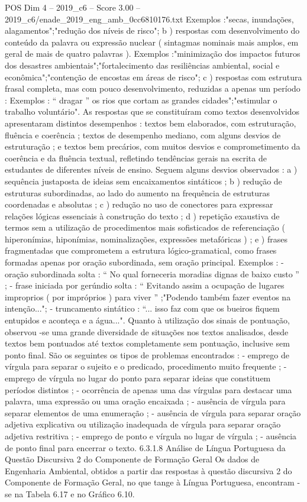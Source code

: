 \begin{textsample}{POS Dim 4 – 2019\_c6 – Score 3.00 – 2019\_c6/enade\_2019\_eng\_amb\_0cc6810176.txt}
Exemplos :"secas, inundações, alagamentos";"redução dos níveis de risco"; b ) respostas com desenvolvimento do conteúdo da palavra ou expressão nuclear ( sintagmas nominais mais amplos, em geral de mais de quatro palavras ).
Exemplos :"minimização dos impactos futuros dos desastres ambientais";"fortalecimento das resiliências ambiental, social e econômica";"contenção de encostas em áreas de risco"; c ) respostas com estrutura frasal completa, mas com pouco desenvolvimento, reduzidas a apenas um período : Exemplos : “ dragar ” os rios que cortam as grandes cidades";"estimular o trabalho voluntário".
As respostas que se constituíram como textos desenvolvidos apresentaram distintos desempenhos : textos bem elaborados, com estruturação, fluência e coerência ; textos de desempenho mediano, com alguns desvios de estruturação ; e textos bem precários, com muitos desvios e comprometimento da coerência e da fluência textual, refletindo tendências gerais na escrita de estudantes de diferentes níveis de ensino.
Seguem alguns desvios observados : a ) sequência justaposta de ideias sem encaixamentos sintáticos ; b ) redução de estruturas subordinadas, ao lado do aumento na frequência de estruturas coordenadas e absolutas ; c ) redução no uso de conectores para expressar relações lógicas essenciais à construção do texto ; d ) repetição exaustiva de termos sem a utilização de procedimentos mais sofisticados de referenciação ( hiperonímias, hiponímias, nominalizações, expressões metafóricas ) ; e ) frases fragmentadas que comprometem a estrutura lógico-gramatical, como frases formadas apenas por oração subordinada, sem oração principal.
Exemplos : - oração subordinada solta : “ No qual forneceria moradias dignas de baixo custo ” ; - frase iniciada por gerúndio solta : “ Evitando assim a ocupação de lugares improprios ( por impróprios ) para viver ” ;"Podendo também fazer eventos na intenção..."; - truncamento sintático : “... isso faz com que os bueiros fiquem entupidos e aconteça e a água...".
Quanto à utilização dos sinais de pontuação, observou -se uma grande diversidade de situações nos textos analisados, desde textos bem pontuados até textos completamente sem pontuação, inclusive sem ponto final.
São os seguintes os tipos de problemas encontrados : - emprego de vírgula para separar o sujeito e o predicado, procedimento muito frequente ; - emprego de vírgula no lugar do ponto para separar ideias que constituem períodos distintos ; - ocorrência de apenas uma das vírgulas para destacar uma palavra, uma expressão ou uma oração encaixada ; - ausência de vírgula para separar elementos de uma enumeração ; - ausência de vírgula para separar oração adjetiva explicativa ou utilização inadequada de vírgula para separar oração adjetiva restritiva ; - emprego de ponto e vírgula no lugar de vírgula ; - ausência de ponto final para encerrar o texto. 6.3.1.8 Análise de Língua Portuguesa da Questão Discursiva 2 do Componente de Formação Geral Os dados de Engenharia Ambiental, obtidos a partir das respostas à questão discursiva 2 do Componente de Formação Geral, no que tange à Língua Portuguesa, encontram -se na Tabela 6.17 e no Gráfico 6.10.

\end{textsample}
